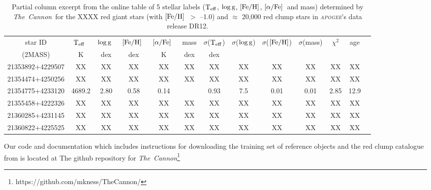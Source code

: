 \documentclass[12pt, preprint]{aastex}
\newcommand{\project}[1]{\textsl{#1}}
\newcommand{\tc}{\project{The~Cannon}}
\newcommand{\apogee}{\project{\textsc{apogee}}}
\newcommand{\teff}{\mbox{$\rm T_{eff}$}}
\newcommand{\feh}{\mbox{$\rm [Fe/H]$}}
\newcommand{\alphafe}{\mbox{$\rm [\alpha/Fe]$}}
\newcommand{\logg}{\mbox{$\rm \log g$}}
\begin{document}
\begin{table}[p]
\tiny{
\centering
\caption{Partial column excerpt from the online table of 5 stellar labels (\teff, \logg, \feh, \alphafe\ and mass) determined by \tc\ for the XXXX red giant stars (with \feh\ $>$ --1.0) and $\approx$ 20,000 red clump stars in \apogee 's data release DR12. } 
\vspace{10pt}
\begin{tabular}{| c | c | c |  c | c | c |  c | c | c | c | c | c | c | } %
\hline
\small{star ID}  & \teff\ & \logg\ & \feh\ & \alphafe\ & mass & $\sigma$(\teff) & $\sigma$(\logg) & $\sigma$(\feh) & $\sigma$(mass)& $\chi^2$ & \tiny{age} \\
\small{(2MASS)} & K & dex &  dex  & K & dex & dex &  & & & &    \\    
\hline
\tiny{21353892+4229507} & XX & XX  & XX  & XX & XX  & XX  & XX & XX & XX & XX & XX\\
\tiny{21354474+4250256} & XX & XX  & XX  & XX & XX  & XX  & XX & XX & XX & XX & XX\\\tiny{21354775+4233120} & 4689.2 & 2.80  & 0.58  & 0.14 &   & 0.93  & 7.5 & 0.01 & 0.01 & 2.85 & 12.9 \\
\tiny{21355458+4222326} & XX & XX  & XX  & XX & XX  & XX  & XX & XX & XX & XX & XX\\
\tiny{21360285+4231145} & XX & XX  & XX  & XX & XX  & XX  & XX & XX & XX & XX & XX\\
\tiny{21360822+4225525} & XX & XX  & XX  & XX & XX  & XX  & XX & XX & XX & XX & XX\\
\hline
\end{tabular}
\label{tab:online} }
\end{table}

Our code and documentation which includes instructions for downloading the training set of reference objects and the red clump catalogue from \citet{Bovy2014} is located at The github repository for \tc \footnote{https://github.com/mkness/TheCannon/}

\end{document}

